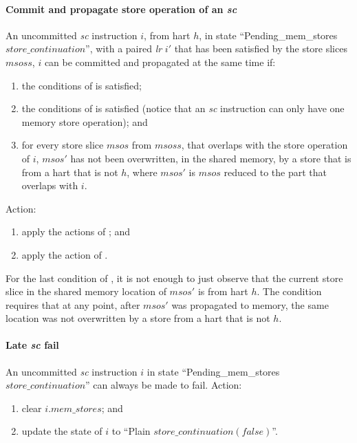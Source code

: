\paragraph{Commit and propagate store operation of an {\em sc}}\label{omm:commit_sc}
An uncommitted {\em sc} instruction $i$, from hart $h$, in state ``{\sc Pending\_mem\_stores} $store\_continuation$'', with a paired {\em lr} $i'$ that has been satisfied by the store slices $msoss$, $i$ can be committed and propagated at the same time if:
\begin{enumerate}
\item the conditions of  is satisfied;
\item the conditions of  is satisfied (notice that an {\em sc} instruction can only have one memory store operation); and
\item for every store slice $msos$ from $msoss$, that overlaps with the store operation of $i$, $msos'$ has not been overwritten, in the shared memory, by a store that is from a hart that is not $h$, where $msos'$ is $msos$ reduced to the part that overlaps with $i$.
\end{enumerate}
Action:
\begin{enumerate}
\item apply the actions of ; and
\item apply the action of .
\end{enumerate}

\begin{commentary}
For the last condition of , it is not enough to just observe that the current store slice in the shared memory location of $msos'$ is from hart $h$.
The condition requires that at any point, after $msos'$ was propagated to memory, the same location was not overwritten by a store from a hart that is not $h$.
\end{commentary}


\paragraph{Late {\em sc} fail}\label{omm:late_sc_fail}
An uncommitted {\em sc} instruction $i$ in state ``{\sc Pending\_mem\_stores} $store\_continuation$'' can always be made to fail.
Action:
\begin{enumerate}
\item clear $i.mem\_stores$; and
\item update the state of $i$ to ``{\sc Plain} $store\_continuation(false)$''.
\end{enumerate}


